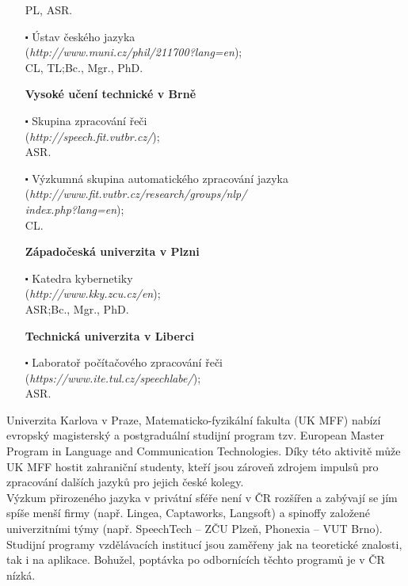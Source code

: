 \begin{multicols}{2}
\begin{itemize}
  PL, ASR. 
 \item[$\centerdot$]Ústav českého jazyka\\
  (\textit{http://www.muni.cz/phil/211700?lang=en});\\
  CL, TL;\hspace*{1em}Bc., Mgr., PhD.
\item[]$\!\!\!\!\!\!$\textbf{Vysoké učení technické v Brně}
 \item[$\centerdot$]Skupina zpracování řeči\\
  (\textit{http://speech.fit.vutbr.cz/});\\
  ASR. 
 \item[$\centerdot$]Výzkumná skupina automatického zpracování jazyka\\
  (\textit{http://www.fit.vutbr.cz/research/groups/nlp/\\\hspace*{2em}index.php?lang=en});\\
  CL. 
\item[]$\!\!\!\!\!\!$\textbf{Západočeská univerzita v Plzni}
 \item[$\centerdot$]Katedra kybernetiky\\
  (\textit{http://www.kky.zcu.cz/en});\\
  ASR;\hspace*{1em}Bc., Mgr., PhD.
\item[]$\!\!\!\!\!\!$\textbf{Technická univerzita v Liberci}
 \item[$\centerdot$]Laboratoř počítačového zpracování řeči\\
  (\textit{https://www.ite.tul.cz/speechlabe/});\\
  ASR. 
\end{itemize}

Univerzita Karlova v Praze, Matematicko-fyzikální fakulta (UK MFF) nabízí evropský magisterský a postgraduální studijní program tzv. European Master Program in Language and Communication Technologies. Díky této aktivitě může UK MFF hostit zahraniční studenty, kteří jsou zároveň zdrojem impulsů pro zpracování dalších jazyků pro jejich české kolegy.\\
Výzkum přirozeného jazyka v privátní sféře není v ČR rozšířen a zabývají se jím spíše menší firmy (např. Lingea, Captaworks, Langsoft) a spinoffy založené univerzitními týmy (např. SpeechTech -- ZČU Plzeň, Phonexia – VUT Brno).\\
Studijní programy vzdělávacích institucí jsou zaměřeny jak na teoretické znalosti, tak i na aplikace. Bohužel, poptávka po odbornících těchto programů je v ČR nízká.


\end{multicols}
